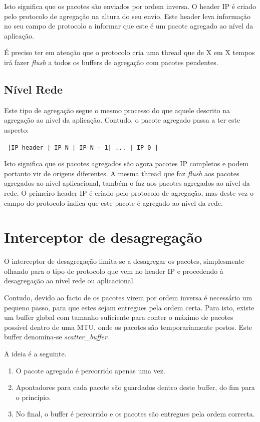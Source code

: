 \documentclass[10pt,a4paper,oneside]{book}
\begin{document}
    Isto significa que os pacotes são enviados por ordem inversa. O header IP é criado pelo protocolo de agregação na altura do seu envio. Este header leva informação no seu campo de protocolo a informar que este é um pacote agregado ao nível da aplicação.
    
    É preciso ter em atenção que o protocolo cria uma thread que de X em X tempos irá fazer \emph{flush} a todos os buffers de agregação com pacotes pendentes.

   \subsection{Nível Rede}
   
    Este tipo de agregação segue o mesmo processo do que aquele descrito na agregação ao nível da aplicação. Contudo, o pacote agregado passa a ter este aspecto:

    {\tt
      |IP header | IP N | IP N - 1| ... | IP 0 |
    }

    Isto significa que os pacotes agregados são agora pacotes IP completos e podem portanto vir de origens diferentes. A mesma thread que faz \emph{flush} aos pacotes agregados ao nível aplicacional, também o faz aos pacotes agregados ao nível da rede. O primeiro header IP é criado pelo protocolo de agregação, mas deste vez o campo do protocolo indica que este pacote é agregado ao nível da rede. 

  \section{Interceptor de desagregação} 

   O interceptor de desagregação limita-se a desagregar os pacotes, simplesmente olhando para o tipo de protocolo que vem no header IP e procedendo à desagregação ao nível rede ou aplicacional.

   Contudo, devido ao facto de os pacotes virem por ordem inversa é necessário um pequeno passo, para que estes sejam entregues pela ordem certa. Para isto, existe um buffer global com tamanho suficiente para conter o máximo de pacotes possível dentro de uma MTU, onde os pacotes são temporariamente postos. Este buffer denomina-se \emph{scatter\_buffer}.

   A ideia é a seguinte.
   
   \begin{enumerate}
    \item O pacote agregado é percorrido apenas uma vez.
    \item Apontadores para cada pacote são guardados dentro deste buffer, do fim para o princípio.
    \item No final, o buffer é percorrido e os pacotes são entregues pela ordem correcta.
   \end{enumerate}
\end{document}
